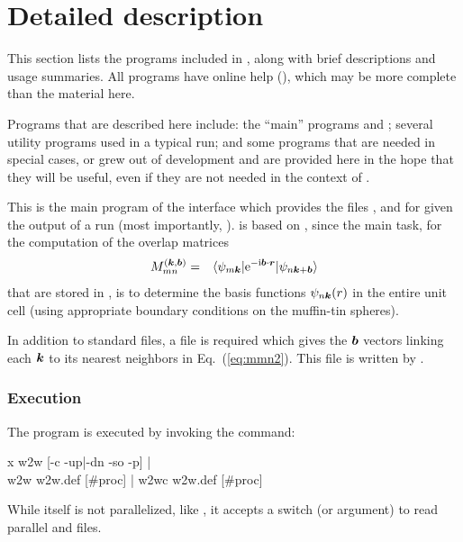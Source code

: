 \chapter{Detailed description}
\label{sec:detaileddescription}
\minitoc

This section lists the programs included in \wtow, along with brief
descriptions and usage summaries.  All programs have online help
(), which may be more complete than the material here.

Programs that are described here include: the ``main'' \wtow programs
\wiiw and \wplot; several utility programs used in a typical \wtow
run; and some programs that are needed in special cases, or grew out
of \wtow development and are provided here in the hope that they will
be useful, even if they are not needed in the context of \wtow.



This is the main program of the interface which provides the files
,  and  for \wannier
given the output of a \wien run (most importantly,
).  \wiiw is based on , since the main
task, for the computation of the overlap matrices
\begin{eqnarray}
\label{eq:mmn}
M_{mn}^{(\boldsymbol{k},\boldsymbol{b})}&=&\langle
\psi_{m\boldsymbol{k}}|\text{e}^{-\text{i}\boldsymbol{b}\cdot\boldsymbol{r}}|\psi_{n\boldsymbol{k}+\boldsymbol{b}}
\rangle
\label{eq:mmn2}
\end{eqnarray}
that are stored in , is to determine the basis
functions $\psi_{n\boldsymbol k}(r)$ in the entire unit cell (using
appropriate boundary conditions on the muffin-tin spheres).

In addition to standard \wien files, a file  is
required which gives the ${\boldsymbol b}$ vectors linking each ${\boldsymbol k}$ to
its nearest neighbors in Eq.~(\ref{eq:mmn2}).  This file is written by
.

\subsection{Execution}

The program \wiiw is executed by invoking the command:
%
\begin{usage}
  x w2w [-c -up|-dn -so -p] |
  \\
  w2w w2w.def [\#proc]
  |
  w2wc w2w.def [\#proc]
\end{usage}

While \wiiw itself is not parallelized, like , it
accepts a  switch (or  argument) to read
parallel  and  files.

